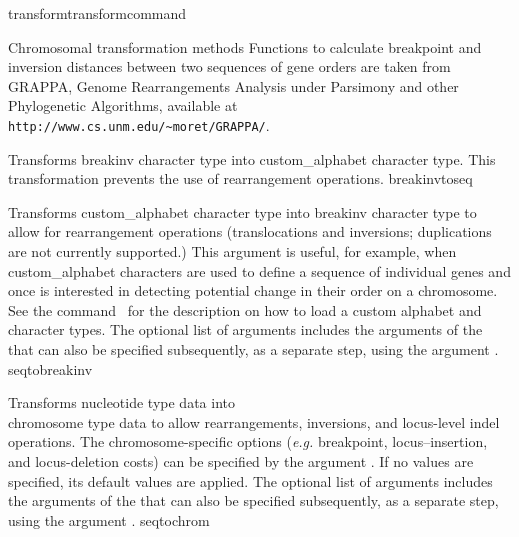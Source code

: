 \begin{command}{transform}{transformcommand}
\begin{arguments}
\begin{argumentgroup}{Chromosomal transformation methods}
          Functions to calculate breakpoint and inversion distances between two
	sequences of gene orders are taken from GRAPPA, Genome
	Rearrangements Analysis under Parsimony and other Phylogenetic Algorithms,
	available at \\ \texttt{http://www.cs.unm.edu/\~{}moret/GRAPPA/}.
    
            {Transforms breakinv character type into custom\_alphabet character
            type. This transformation prevents the use of rearrangement operations.} 
            {breakinvtoseq}

            {Transforms custom\_alphabet character type into breakinv
            character type to allow for rearrangement operations
            (translocations and inversions; duplications are not currently
            supported.) This argument is useful, for example, when
            custom\_alphabet characters are used to define a sequence of
            individual genes and once is interested in detecting potential
            change in their order on a chromosome. See the
            command~ for the description on how to load a custom
            alphabet and  character types. The optional list of arguments
            includes the arguments of the  that can also
            be specified subsequently, as a separate step, using the argument .} 
            {seqtobreakinv}
            
            {Transforms nucleotide type data into \\ chromosome type data to allow
            rearrangements, inversions, and locus-level indel operations. The
            chromosome-specific options (\emph{e.g.} breakpoint,
            locus--insertion, and locus-deletion costs) can be specified by the argument
            . If no  values
            are specified, its default values are applied. The optional list of arguments
            includes the arguments of the  that can also
            be specified subsequently, as a separate step, using the argument .}
            {seqtochrom}


\end{argumentgroup}
\end{arguments}
\end{command}
